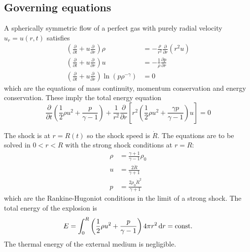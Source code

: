 \documentclass{jknotes}
\begin{document}
\subsection{Governing equations}
A spherically symmetric flow of a perfect gas with purely radial velocity $u_r
= u(r,t)$ satisfies
\begin{align}
\left( \frac{\partial}{\partial t} + u \frac{\partial}{\partial r}\right)\rho
&= -\frac{\rho}{r^2} \frac{\partial}{\partial r} (r^2 u) \label{eq:l13:1} \\
\left( \frac{\partial}{\partial t} + u \frac{\partial}{\partial r}\right)u
&= -\frac{1}{\rho} \frac{\partial p}{\partial r} \label{eq:l13:2} \\
\left( \frac{\partial}{\partial t} + u \frac{\partial}{\partial r}\right) \ln
	(p \rho^{-\gamma}) &= 0 \label{eq:l13:3}
\end{align}
which are the equations of mass continuity, momentum conservation and energy
conservation. These imply the total energy equation
\begin{equation}
	\frac{\partial}{\partial t}\left(\frac{1}{2}\rho u^2 + \frac{p}{\gamma
	-1}\right) + \frac{1}{r^2} \frac{\partial}{\partial r} \left[ r^2 \left(
	\frac{1}{2}\rho u^2 + \frac{\gamma p}{\gamma -1}\right)u\right] = 0
	\label{eq:l13:energy}
\end{equation}

The shock is at $r=R(t)$ so the shock speed is $\dot{R}$. The equations are to
be solved in $0 < r < R$ with the strong shock conditions at $r=R$:
\begin{align}
	\rho &= \frac{\gamma+1}{\gamma-1} \rho_0 \label{eq:l13:4}\\
	u&= \frac{2 \dot{R}}{\gamma +1}\label{eq:l13:5}\\
	p &= \frac{2\rho_0 \dot{R}^2}{\gamma +1} \label{eq:l13:6}
\end{align}
which are the Rankine-Hugoniot conditions in the limit of a strong shock. The
total energy of the explosion is
\begin{equation}
	E = \int_0^R \left( \frac{1}{2}\rho u^2 + \frac{p}{\gamma -1}\right) 4\pi
	r^2 \, \diffd r = \text{const.}
\end{equation}
The thermal energy of the external medium is negligible.
\end{document}
